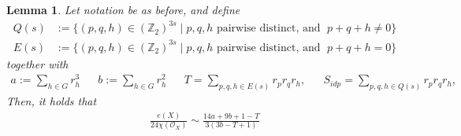 \documentclass[12pt,twoside,]{amsart}
\theoremstyle{plain}
\newtheorem{lemma}[theorem]{Lemma}
\theoremstyle{definition}
\begin{document}
\begin{lemma}\label{lemma:e_chi_rewrite}
Let notation be as before,  and define
\begin{align*}
Q(s) &:= 
\{
(p,q,h) \in (\mathbb{Z}_2)^{3s}
\; | \;
p, q, h \text{ pairwise distinct, and }\;
p+q+h \neq 0 
\}
\\
E(s)
&:= \{
(p,q,h) \in (\mathbb{Z}_2)^{3s}
\; | \;
p, q, h \text{ pairwise distinct, and }\;
p+q+h = 0 
\}
\end{align*}
together with 
\begin{align*}
 a:= \sum_{h\in G} r_h^3   
 &&
 b:= \sum_{h\in G} r_h^2 
 &&
 T = 
 \sum_{p,q,h \in E(s)}
r_p r_q r_h,
&&
S_{idp} = 
 \sum_{p,q,h \in Q(s)}
r_p r_q r_h,
\end{align*}
Then, it holds that
 \begin{align}\label{eq:ration_e_O}
  \frac{e(X)}{24\chi(\mathcal{O}_X)}
\sim
\frac{14a+9b+1-T}{3(3b-T+1)}
\end{align}   
\end{lemma}
\end{document}
